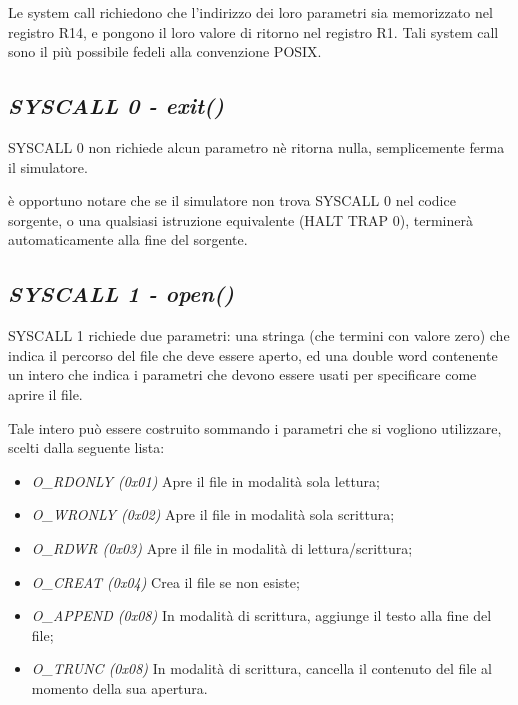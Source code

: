 \documentclass[letterpaper,10pt,english]{sphinxmanual}
\begin{document}
Le system call richiedono che l'indirizzo dei loro parametri sia memorizzato
nel registro R14, e pongono il loro valore di ritorno nel registro R1.  Tali
system call sono il più possibile fedeli alla convenzione POSIX.


\subsection{\emph{SYSCALL 0 - exit()}}
\label{instructions:syscall-0-exit}
SYSCALL 0 non richiede alcun parametro nè ritorna nulla, semplicemente ferma
il simulatore.

è opportuno notare che se il simulatore non trova SYSCALL 0 nel codice
sorgente, o una qualsiasi istruzione equivalente (HALT  TRAP 0), terminerà
automaticamente alla fine del sorgente.


\subsection{\emph{SYSCALL 1 - open()}}
\label{instructions:syscall-1-open}
SYSCALL 1 richiede due parametri: una stringa (che termini con valore zero) che
indica il percorso del file che deve essere aperto, ed una double word
contenente un intero che indica i parametri che devono essere usati per
specificare come aprire il file.

Tale intero può essere costruito sommando i parametri che si vogliono
utilizzare, scelti dalla seguente lista:
\begin{itemize}
\item {} 
\emph{O\_RDONLY (0x01)} Apre il file in modalità sola lettura;

\item {} 
\emph{O\_WRONLY (0x02)} Apre il file in modalità sola scrittura;

\item {} 
\emph{O\_RDWR (0x03)} Apre il file in modalità di lettura/scrittura;

\item {} 
\emph{O\_CREAT (0x04)} Crea il file se non esiste;

\item {} 
\emph{O\_APPEND (0x08)} In modalità di scrittura, aggiunge il testo alla fine del file;

\item {} 
\emph{O\_TRUNC (0x08)} In modalità di scrittura, cancella il contenuto del file al momento della sua apertura.

\end{itemize}
\end{document}
